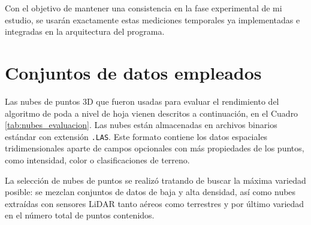 Con el objetivo de mantener una consistencia en la fase experimental de mi estudio, se usarán exactamente estas mediciones temporales ya implementadas e integradas en la arquitectura del programa. 


\section{Conjuntos de datos empleados}
Las nubes de puntos 3D que fueron usadas para evaluar el rendimiento del algoritmo de poda a nivel de hoja vienen descritos a continuación, en el Cuadro \ref{tab:nubes_evaluacion}. Las nubes están almacenadas en archivos binarios estándar con extensión \texttt{.LAS}. Este formato contiene los datos espaciales tridimensionales aparte de campos opcionales con más propiedades de los puntos, como intensidad, color o clasificaciones de terreno.

La selección de nubes de puntos se realizó tratando de buscar la máxima variedad posible: se mezclan conjuntos de datos de baja y alta densidad, así como nubes extraídas con sensores LiDAR tanto aéreos como terrestres y por último variedad en el número total de puntos contenidos.

